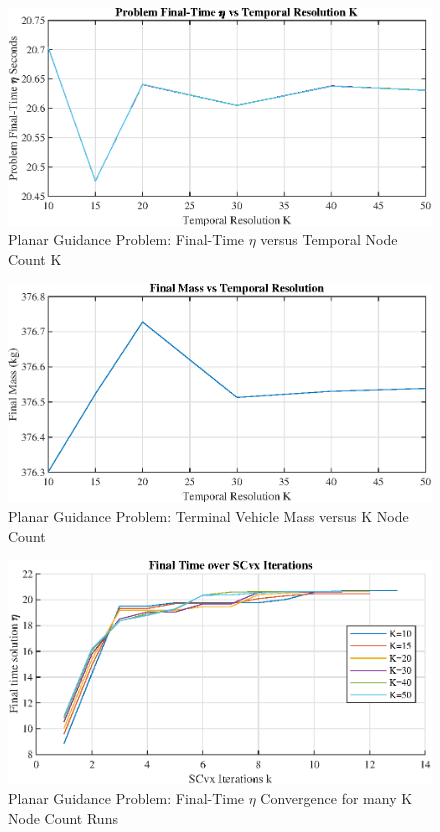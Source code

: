 \begin{figure}[!htbp] 
\label{}
  \centering
  \includegraphics[width=\textwidth]{figs/etavsK.eps}
  \caption{Planar Guidance Problem: Final-Time $\eta$ versus Temporal Node Count K}
  \label{fig:finaltimeplot}
\end{figure}

\begin{figure}[!htbp] 
\label{}
  \centering
  \includegraphics[width=\textwidth]{figs/massvsK.eps}
  \caption{Planar Guidance Problem: Terminal Vehicle Mass versus K Node Count}
  \label{fig:massdisperse}
\end{figure}

\begin{figure}[!htbp] 
\label{}
  \centering
  \includegraphics[width=\textwidth]{figs/iteratetiming.eps}
  \caption{Planar Guidance Problem: Final-Time $\eta$ Convergence for many K Node Count Runs}
  \label{fig:iterations}
\end{figure}

